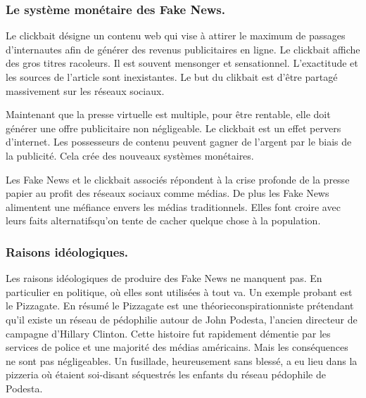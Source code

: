 \subsubsection{Le système monétaire des Fake News.}


Le clickbait désigne un contenu web qui vise à attirer le maximum de passages d'internautes afin de générer des revenus publicitaires en ligne.
Le clickbait affiche des gros titres racoleurs.
Il est souvent mensonger et sensationnel.
L'exactitude et les sources de l'article sont inexistantes.
Le but du clikbait est d'être partagé massivement sur les réseaux sociaux.

Maintenant que la presse virtuelle est multiple, pour être rentable, elle doit générer une offre publicitaire non négligeable.
Le clickbait est un effet pervers d'internet.
Les possesseurs de contenu peuvent gagner de l'argent par le biais de la publicité.
Cela crée des nouveaux systèmes monétaires.

Les Fake News et le clickbait associés répondent à la crise profonde de la presse papier au profit des réseaux sociaux comme médias.
De plus les Fake News alimentent une méfiance envers les médias traditionnels.
Elles font croire avec leurs \og faits alternatifs\fg qu'on tente de cacher quelque chose à la population.

\subsubsection{Raisons idéologiques.}
Les raisons idéologiques de produire des Fake News ne manquent pas.
En particulier en politique, où elles sont utilisées à tout va.
Un exemple probant est le Pizzagate.
En résumé le Pizzagate est une \og théorie\fg conspirationniste prétendant qu'il existe un réseau de pédophilie autour de John Podesta, l'ancien directeur de campagne d'Hillary Clinton.
Cette histoire fut rapidement démentie par les services de police et une majorité des médias américains. Mais les conséquences ne sont pas négligeables.
Un fusillade, heureusement sans blessé, a eu lieu dans la pizzeria où étaient soi-disant séquestrés les enfants du réseau pédophile de Podesta.
